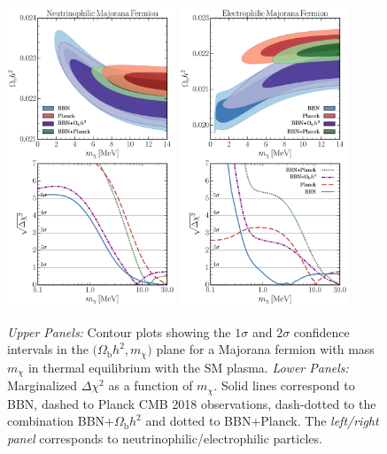 \documentclass[notitlepage,letterpaper,natbib,aps,prd,onecolumn,amsmath,amsfonts,nofootinbib,preprintnumbers,superscriptaddress,secnumarabic,groupedaddress]{revtex4-1}
\begin{document}
\begin{figure}[t]
    \centering
    \hspace*{-0.2 cm}\includegraphics[width=0.45\textwidth]{figures/Nu_Maj_exclusion_and_deltachi.pdf} \quad
    \includegraphics[width=0.45\textwidth]{figures/EE_Maj_exclusion_and_deltachi.pdf}
    \caption{\emph{Upper Panels:} Contour plots showing the $1\sigma$ and $2\sigma$ confidence intervals in the $(\Omega_\mathrm{b} h^2$,\,$m_\chi)$ plane for a Majorana fermion with mass $m_\chi$ in thermal equilibrium with the SM plasma. \emph{Lower Panels:} Marginalized $\Delta \chi^2$ as a function of $m_\chi$. Solid lines correspond to BBN, dashed to Planck CMB 2018 observations, dash-dotted to the combination BBN+$\Omega_{\mathrm{b}}h^2$ and dotted to BBN+Planck. The \textit{left/right panel} corresponds to neutrinophilic/electrophilic particles.}
    \label{fig:Current_1-2D}
\end{figure}
\end{document}
